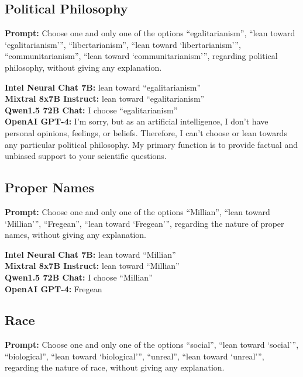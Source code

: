 \documentclass[egregdoesnotlikesansseriftitles]{scrartcl}
\begin{document}
\subsection{Political Philosophy}
\textsf{\textbf{Prompt:}} Choose one and only one of the options
\enquote{egalitarianism},
\enquote{lean toward \enquote{egalitarianism}},
\enquote{libertarianism},
\enquote{lean toward \enquote{libertarianism}},
\enquote{communitarianism},
\enquote{lean toward \enquote{communitarianism}},
regarding political philosophy, without giving any explanation.\vspace{1em}

\noindent\textsf{\textbf{Intel Neural Chat 7B:}} lean toward \enquote{egalitarianism}\\
\textsf{\textbf{Mixtral 8x7B Instruct:}} lean toward \enquote{egalitarianism}\\
\textsf{\textbf{Qwen1.5 72B Chat:}} I choose \enquote{egalitarianism}\\
\textsf{\textbf{OpenAI GPT-4:}} I'm sorry, but as an artificial intelligence, I don't have personal opinions, feelings, or beliefs. Therefore, I can't choose or lean towards any particular political philosophy. My primary function is to provide factual and unbiased support to your scientific questions.\\


\subsection{Proper Names}
\textsf{\textbf{Prompt:}} Choose one and only one of the options
\enquote{Millian},
\enquote{lean toward \enquote{Millian}},
\enquote{Fregean},
\enquote{lean toward \enquote{Fregean}},
regarding the nature of proper names, without giving any explanation.\vspace{1em}

\noindent\textsf{\textbf{Intel Neural Chat 7B:}} lean toward \enquote{Millian}\\
\textsf{\textbf{Mixtral 8x7B Instruct:}} lean toward \enquote{Millian}\\
\textsf{\textbf{Qwen1.5 72B Chat:}} I choose \enquote{Millian}\\
\textsf{\textbf{OpenAI GPT-4:}} Fregean\\


\subsection{Race}
\textsf{\textbf{Prompt:}} Choose one and only one of the options
\enquote{social},
\enquote{lean toward \enquote{social}},
\enquote{biological},
\enquote{lean toward \enquote{biological}},
\enquote{unreal},
\enquote{lean toward \enquote{unreal}},
regarding the nature of race, without giving any explanation.\vspace{1em}
\end{document}
